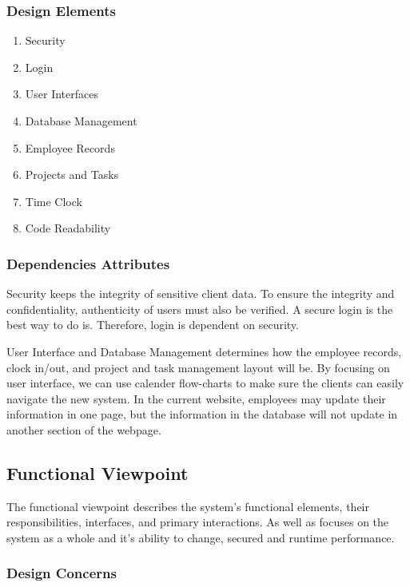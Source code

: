\documentclass[letterpaper,10pt,titlepage,journal,compsoc,draftclsnofoot,onecolumn]{IEEEtran}
\newcommand\tab[1][1cm]{\hspace*{#1}}
\begin{document}
\subsubsection{Design Elements}

\begin{enumerate}
\item{Security}
\item{Login}
\item{User Interfaces}
\item{Database Management}
\item{Employee Records}
\item{Projects and Tasks}
\item{Time Clock}
\item{Code Readability}
\end{enumerate}

\subsubsection{Dependencies Attributes}

\tab Security keeps the integrity of sensitive client data. To ensure the integrity and confidentiality, authenticity of users must also be verified. A secure login is the best way to do is. Therefore, login is dependent on security.\newline


\tab User Interface and Database Management determines how the employee records, clock in/out, and project and task management layout will be.  By focusing on user interface, we can use calender flow-charts to make sure the clients can easily navigate the new system. In the current website, employees may update their information in one page, but the information in the database will not update in another section of the webpage. \newline

\subsection{Functional Viewpoint}

The functional viewpoint describes the system’s functional elements, their responsibilities, interfaces, and primary interactions. As well as focuses on the system as a whole and it’s ability to change, secured and runtime performance.

\subsubsection{Design Concerns}
\end{document}
